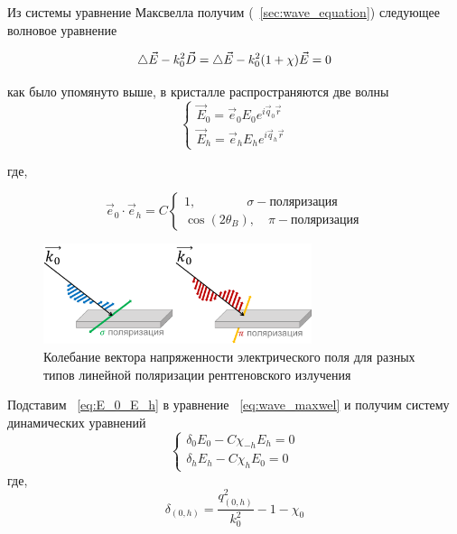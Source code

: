 
 Из системы уравнение Максвелла получим (~\ref{sec:wave_equation}) следующее волновое уравнение

\begin{equation}
 \mathop{}\!\mathbin\bigtriangleup \vec{E} - k_0^2 \vec{D} = \mathop{}\!\mathbin\bigtriangleup \vec{E} - k_0^2 (1+\chi)\vec{E} = 0
 \label{eq:wave_maxwel}
\end{equation}

как было упомянуто выше, в кристалле распространяются две волны
\begin{equation}
 \begin{cases}
   \vec{E}_0 = \vec{e}_0 E_0 e^{i\vec{q}_0\vec{r}}
   \\
   \vec{E}_h = \vec{e}_h E_h e^{i\vec{q}_h\vec{r}}
 \end{cases}
 \label{eq:E_0_E_h}
\end{equation}

где,

\begin{equation}
\vec{e}_0 \cdot \vec{e}_h = C
 \begin{cases}
   1, \quad \quad \quad \quad  \sigma    - \text{поляризация}\\
   \cos(2\theta_B), \quad   \pi - \text{поляризация}
 \end{cases}
\end{equation}

\begin{figure}[H]
  \centering
  \includegraphics[width=0.7\textwidth]{images/polarize_E.png}
  \caption{ Колебание вектора напряженности электрического поля для разных типов линейной поляризации рентгеновского излучения}
  \label{ris:polarize_E}
\end{figure}

Подставим  ~\ref{eq:E_0_E_h} в уравнение ~\ref{eq:wave_maxwel} и получим
систему динамических уравнений
\begin{equation}
 \begin{cases}
   \delta_0 E_0 - C\chi_{-h}E_h=0
   \\
   \delta_h E_h - C\chi_{h}E_0=0
 \end{cases}
\end{equation}
где,
\begin{equation}
   \delta_{(0,h)} = \frac{q_{(0,h)}^2}{k_0^2}-1-\chi_0
\end{equation}


